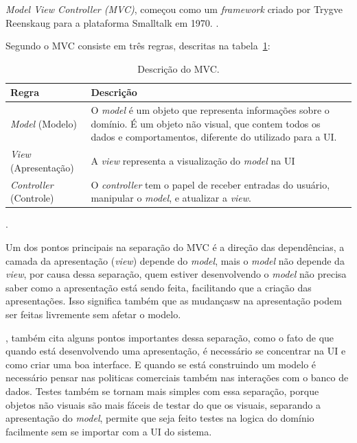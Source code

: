 \textit{Model View Controller (MVC)}, começou como um \textit{framework} criado por Trygve Reenskaug para a plataforma Smalltalk em 1970. \cite[p.~321]{martin_fowler_patterns}.

Segundo  o \ac{MVC} consiste em três regras, descritas na tabela~\ref{tbl:mvc}:

\begin{table}[htdp]
    \begin{center}
        \begin{tabular}{|l|p{10cm}|}
            \hline \textbf{Regra} & \textbf{Descrição} \\
            \hline \textit{Model} (Modelo) & 
            O \textit{model} é um objeto que representa informações sobre o domínio. É um objeto não visual, que contem todos os dados e comportamentos, diferente do utilizado para a UI. \\
            \hline \textit{View} (Apresentação) & 
            A \textit{view} representa a visualização do \textit{model} na \ac{UI} \\
            \hline \textit{Controller} (Controle) & 
            O \textit{controller} tem o papel de receber entradas do usuário, manipular o \textit{model}, e atualizar a \textit{view}. \\
            \hline
        \end{tabular}
        \caption{Descrição do \ac{MVC}.}.
        \label{tbl:mvc}
    \end{center}
\end{table}

Um dos pontos principais na separação do \ac{MVC} é a direção das dependências, a camada da apresentação (\textit{view}) depende do \textit{model}, mais o \textit{model} não depende da \textit{view}, por causa dessa separação, quem estiver desenvolvendo o \textit{model} não precisa saber como a apresentação está sendo feita, facilitando que a criação das apresentações. Isso significa também que as mudançasw na apresentação podem ser feitas livremente sem afetar o modelo.

, também cita alguns pontos importantes dessa separação, como o fato de que quando está desenvolvendo uma apresentação, é necessário se concentrar na \ac{UI} e como criar uma boa interface. E quando se está construindo um modelo é necessário pensar nas politicas comerciais também nas interações com o banco de dados. Testes também se tornam mais simples com essa separação, porque objetos não visuais são mais fáceis de testar do que os visuais, separando a apresentação do \textit{model}, permite que seja feito testes na logica do domínio facilmente sem se importar com a \ac{UI} do sistema.
